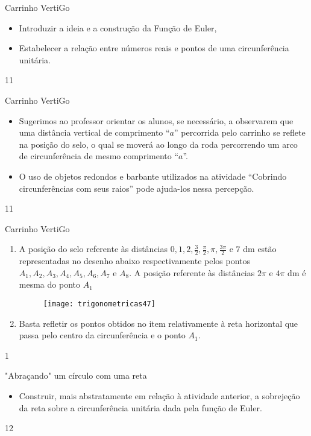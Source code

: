 \cleardoublepage
\def\currentcolor{session1}
\begin{objectives}{Carrinho VertiGo}
{
\begin{itemize}
\item Introduzir a ideia e a construção da Função de Euler,
\item Estabelecer a relação entre números reais e pontos de uma circunferência unitária.
\end{itemize}
}{1}{1}
\end{objectives}
\begin{sugestions}{Carrinho VertiGo}
{
\begin{itemize}
\item Sugerimos ao professor orientar os alunos, se necessário, a observarem que uma distância vertical de comprimento “$a$”{} percorrida pelo carrinho se reflete na posição do selo, o qual se moverá ao longo da roda percorrendo um arco de circunferência de mesmo comprimento “$a$”.
\item  O uso de objetos redondos e barbante utilizados na atividade “Cobrindo circunferências com seus raios”{} pode ajuda-los nessa percepção.
\end{itemize}
}{1}{1}
\end{sugestions}
\clearmargin
\marginpar{\vspace{.5em}}
\begin{answer}{Carrinho VertiGo}
{
 \begin{enumerate}
 \item A posição do selo referente às distâncias $0, 1, 2, \frac{3}{2}, \frac{\pi}{2}, \pi, \frac{3\pi}{2}$ e $7$ dm estão representadas  no desenho abaixo respectivamente pelos pontos $A_1, A_2, A_3, A_4, A_5, A_6, A_7\text{ e }A_8$. A posição referente às distâncias $2\pi$ e $4\pi$ dm é mesma do ponto $A_1$

 \begin{figure}[H]
 \centering
 
 \texttt{[image: trigonometricas47]}
 \end{figure}
 \item Basta refletir os pontos obtidos no item  relativamente à reta horizontal que passa pelo centro da circunferência e o ponto $A_1$.
 \end{enumerate}
}{1}
\end{answer}
\begin{objectives}{"Abraçando"{} um círculo com uma reta}
{
\begin{itemize}
\item Construir, mais abstratamente em relação à atividade anterior, a sobrejeção da reta sobre a circunferência unitária dada pela função de Euler.
\end{itemize}
}{1}{2}
\end{objectives}
